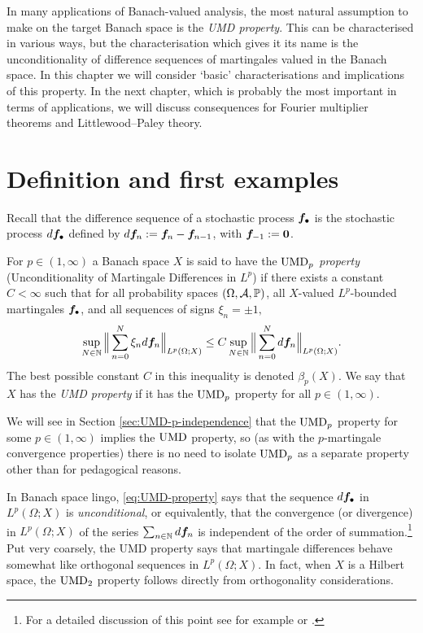 In many applications of Banach-valued analysis, the most natural assumption to make on the target Banach space is the \emph{UMD property}.
This can be characterised in various ways, but the characterisation which gives it its name is the unconditionality of difference sequences of martingales valued in the Banach space.
In this chapter we will consider `basic' characterisations and implications of this property.
In the next chapter, which is probably the most important in terms of applications, we will discuss consequences for Fourier multiplier theorems and Littlewood--Paley theory.

\section{Definition and first examples}

Recall that the difference sequence of a stochastic process $\bm{f}_{\bullet}$ is the stochastic process $d\bm{f}_{\bullet}$ defined by $d\bm{f}_{n} := \bm{f}_{n} - \bm{f}_{n-1}$, with $\bm{f}_{-1} := \bm{0}$.

\begin{defn}
  For $p \in (1,\infty)$ a Banach space $X$ is said to have the \emph{$\mathrm{UMD}_{p}$ property} (Unconditionality of Martingale Differences in $L^p$) if there exists a constant $C < \infty$ such that for all probability spaces $(\Omega,\mathcal{A},\mathbb{P})$, all $X$-valued $L^p$-bounded martingales $\bm{f}_{\bullet}$, and all sequences of signs $\xi_n = \pm 1,$
  \begin{equation}\label{eq:UMD-property}
    \sup_{N \in \mathbb{N}} \Big\| \sum_{n=0}^{N} \xi_{n} d\bm{f}_{n} \Big\|_{L^p(\Omega;X)} \leq C \sup_{N \in \mathbb{N}} \Big\| \sum_{n=0}^{N} d\bm{f}_{n}\Big\|_{L^p(\Omega;X)}.
  \end{equation}
  The best possible constant $C$ in this inequality is denoted $\beta_{p}(X)$.
  We say that $X$ has the \emph{UMD property} if it has the $\mathrm{UMD}_{p}$ property for all $p \in (1,\infty)$.
\end{defn}

\begin{rmk}
  We will see in Section \ref{sec:UMD-p-independence} that the $\mathrm{UMD}_{p}$ property for some $p \in (1,\infty)$ implies the $\mathrm{UMD}$ property, so (as with the $p$-martingale convergence properties) there is no need to isolate $\mathrm{UMD}_{p}$ as a separate property other than for pedagogical reasons.
\end{rmk}

In Banach space lingo, \eqref{eq:UMD-property} says that the sequence $d\bm{f}_\bullet$ in $L^p(\Omega;X)$ is \emph{unconditional}, or equivalently, that the convergence (or divergence) in $L^p(\Omega;X)$ of the series $\sum_{n \in \mathbb{N}} d\bm{f}_n$ is independent of the order of summation.\footnote{For a detailed discussion of this point see for example \cite[Section 4.1.b]{HNVW16} or \cite[Section 1.c]{LT77}.}
Put very coarsely, the UMD property says that martingale differences behave somewhat like orthogonal sequences in $L^p(\Omega;X)$.
In fact, when $X$ is a Hilbert space, the $\mathrm{UMD}_{2}$ property follows directly from orthogonality considerations.

